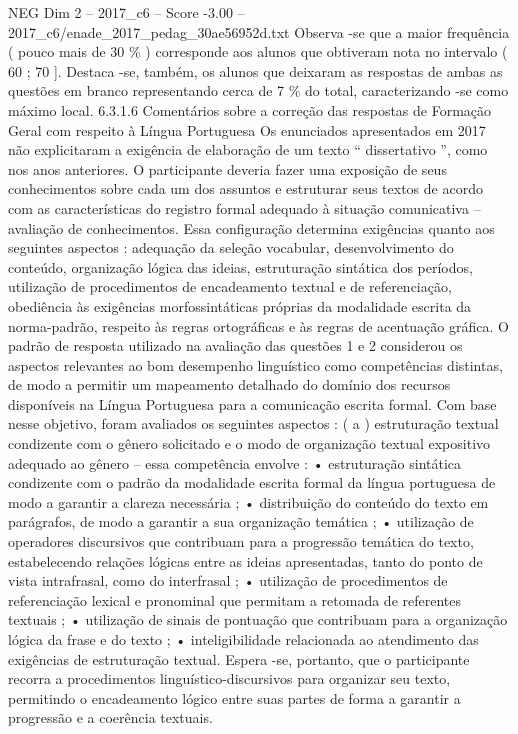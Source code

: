 \begin{textsample}{NEG Dim 2 – 2017\_c6 – Score -3.00 – 2017\_c6/enade\_2017\_pedag\_30ae56952d.txt}
Observa -se que a maior frequência ( pouco mais de 30 \% ) corresponde aos alunos que obtiveram nota no intervalo ( 60 ; 70 ].
Destaca -se, também, os alunos que deixaram as respostas de ambas as questões em branco representando cerca de 7 \% do total, caracterizando -se como máximo local. 6.3.1.6 Comentários sobre a correção das respostas de Formação Geral com respeito à Língua Portuguesa Os enunciados apresentados em 2017 não explicitaram a exigência de elaboração de um texto “ dissertativo ”, como nos anos anteriores.
O participante deveria fazer uma exposição de seus conhecimentos sobre cada um dos assuntos e estruturar seus textos de acordo com as características do registro formal adequado à situação comunicativa – avaliação de conhecimentos.
Essa configuração determina exigências quanto aos seguintes aspectos : adequação da seleção vocabular, desenvolvimento do conteúdo, organização lógica das ideias, estruturação sintática dos períodos, utilização de procedimentos de encadeamento textual e de referenciação, obediência às exigências morfossintáticas próprias da modalidade escrita da norma-padrão, respeito às regras ortográficas e às regras de acentuação gráfica.
O padrão de resposta utilizado na avaliação das questões 1 e 2 considerou os aspectos relevantes ao bom desempenho linguístico como competências distintas, de modo a permitir um mapeamento detalhado do domínio dos recursos disponíveis na Língua Portuguesa para a comunicação escrita formal.
Com base nesse objetivo, foram avaliados os seguintes aspectos : ( a ) estruturação textual condizente com o gênero solicitado e o modo de organização textual expositivo adequado ao gênero – essa competência envolve : • estruturação sintática condizente com o padrão da modalidade escrita formal da língua portuguesa de modo a garantir a clareza necessária ; • distribuição do conteúdo do texto em parágrafos, de modo a garantir a sua organização temática ; • utilização de operadores discursivos que contribuam para a progressão temática do texto, estabelecendo relações lógicas entre as ideias apresentadas, tanto do ponto de vista intrafrasal, como do interfrasal ; • utilização de procedimentos de referenciação lexical e pronominal que permitam a retomada de referentes textuais ; • utilização de sinais de pontuação que contribuam para a organização lógica da frase e do texto ; • inteligibilidade relacionada ao atendimento das exigências de estruturação textual.
Espera -se, portanto, que o participante recorra a procedimentos linguístico-discursivos para organizar seu texto, permitindo o encadeamento lógico entre suas partes de forma a garantir a progressão e a coerência textuais.

\end{textsample}

